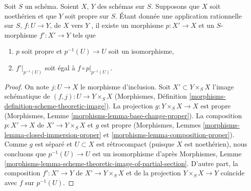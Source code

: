 \begin{lemma}
\label{lemma-extend-rational-map-after-modification}
Soit  $S$  un schéma. Soient  $X$,  $Y$  des schémas sur
 $S$. Supposons que  $X$  soit noethérien et que  $Y$  soit
propre sur  $S$. Étant donnée une application rationnelle sur  $S$,
 $f : U \to Y$, de  $X$  vers  $Y$ , il existe un morphisme
 $p : X' \to X$  et un  $S$-morphisme  $f' : X' \to Y$  tels que
\begin{enumerate}
\item $p$  soit propre et  $p^{-1}(U) \to U$  soit un isomorphisme,
\item $f'|_{p^{-1}(U)}$  soit égal à  $f \circ p|_{p^{-1}(U)}$.
\end{enumerate}
\end{lemma}

\begin{proof}
On note  $j : U \to X$  le morphisme d'inclusion. Soit  $X' \subset Y \times_S X$  l'image
schématique de  $(f, j) : U \to Y \times_S X$  (Morphismes, Définition  \ref{morphisms-definition-scheme-theoretic-image}). La projection
 $g : Y \times_S X \to X$  est propre (Morphismes, Lemme  \ref{morphisms-lemma-base-change-proper}). La composition
 $p : X' \to X$  de  $X' \to Y \times_S X$  et  $g$  est propre (Morphismes, Lemmes
 \ref{morphisms-lemma-closed-immersion-proper}  et  \ref{morphisms-lemma-composition-proper}). Comme  $g$  est séparé et  $U \subset X$  est
rétrocompact (puisque  $X$  est noethérien), nous concluons que
 $p^{-1}(U) \to U$  est un isomorphisme d'après Morphismes, Lemme  \ref{morphisms-lemma-scheme-theoretic-image-of-partial-section}. D'autre
part, la composition  $f' : X' \to Y$  de  $X' \to Y \times_S X$  et de la projection  $Y \times_S X \to Y$ 
coïncide avec  $f$  sur  $p^{-1}(U)$.
\end{proof}













